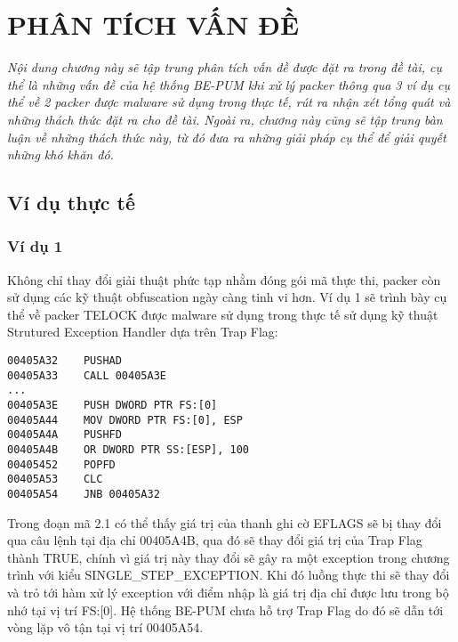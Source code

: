 
\newpage
\chapter{PHÂN TÍCH VẤN ĐỀ}

\begin{concept}[15cm]
\textit{Nội dung chương này sẽ tập trung phân tích vấn đề được đặt ra trong đề tài, cụ thể là những vấn đề của hệ thống BE-PUM khi xử lý packer thông qua 3 ví dụ cụ thể về 2 packer được malware sử dụng trong thực tế, rút ra nhận xét tổng quát và những thách thức đặt ra cho đề tài. Ngoài ra, chương này cũng sẽ tập trung bàn luận về những thách thức này, từ đó đưa ra những giải pháp cụ thể để giải quyết những khó khăn đó.}
\end{concept}

\section{Ví dụ thực tế}

\subsection{Ví dụ 1}

\hspace{0.5cm}Không chỉ thay đổi giải thuật phức tạp nhằm đóng gói mã thực thi, packer còn sử dụng các kỹ thuật obfuscation ngày càng tinh vi hơn. Ví dụ 1 sẽ trình bày cụ thể về packer TELOCK được malware sử dụng trong thực tế sử dụng kỹ thuật Strutured Exception Handler dựa trên Trap Flag:\\ 

\begin{code}
\begin{lstlisting}[captionpos=b,caption={Kỹ thuật Strutured Exception Handler sử dụng trong packer TELOCK},frame=single]
00405A32	PUSHAD
00405A33	CALL 00405A3E
...
00405A3E	PUSH DWORD PTR FS:[0] 
00405A44	MOV DWORD PTR FS:[0], ESP
00405A4A	PUSHFD
00405A4B	OR DWORD PTR SS:[ESP], 100
00405452	POPFD
00405A53	CLC
00405A54	JNB 00405A32
\end{lstlisting}
\end{code}

\hspace{0.5cm}Trong đoạn mã 2.1 có thể thấy giá trị của thanh ghi cờ EFLAGS sẽ bị thay đổi qua câu lệnh tại địa chỉ 00405A4B, qua đó sẽ thay đổi giá trị của Trap Flag thành TRUE, chính vì giá trị này thay đổi sẽ gây ra một exception trong chương trình với kiểu SINGLE\_STEP\_EXCEPTION. Khi đó luồng thực thi sẽ thay đổi và trỏ tới hàm xử lý exception với điểm nhập là giá trị địa chỉ được lưu trong bộ nhớ tại vị trí FS:[0]. Hệ thống BE-PUM chưa hỗ trợ Trap Flag do đó sẽ dẫn tới vòng lặp vô tận tại vị trí 00405A54.

